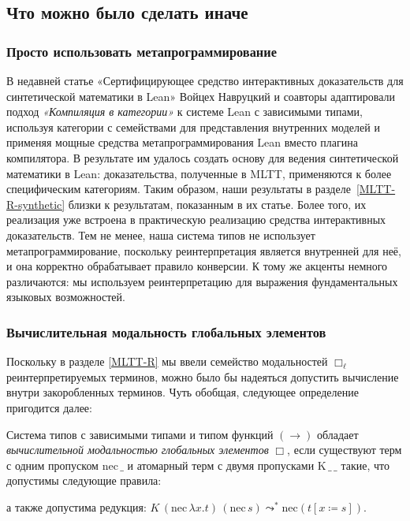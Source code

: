 \subsection{Что можно было сделать иначе}

\subsubsection
{Просто использовать метапрограммирование}

В недавней статье «Сертифицирующее средство
интерактивных доказательств для синтетической
математики в Lean» Войцех Навруцкий и соавторы
\cite{Nawrocki:Lean2026} адаптировали подход
\emph{«Компиляция в категории»}
\cite{Elliott:Compcat2017} к системе Lean с зависимыми
типами, используя категории с семействами для
представления внутренних моделей и применяя мощные
средства метапрограммирования Lean вместо плагина
компилятора. В результате им удалось создать основу
для ведения синтетической математики в Lean:
доказательства, полученные в MLTT, применяются к более
специфическим категориям. Таким образом, наши
результаты в разделе~\ref{MLTT-R-synthetic} близки к
результатам, показанным в их статье. Более того, их
реализация уже встроена в практическую реализацию
средства интерактивных доказательств. Тем не менее,
наша система типов не использует метапрограммирование,
поскольку реинтерпретация является внутренней для неё,
и она корректно обрабатывает правило конверсии. К тому
же акценты немного различаются: мы используем
реинтерпретацию для выражения фундаментальных языковых
возможностей.

\subsubsection{
    Вычислительная модальность глобальных элементов}
\label{global-elements}

Поскольку в разделе \ref{MLTT-R} мы ввели семейство
модальностей $\Box_\ell$ реинтерпретируемых терминов,
можно было бы надеяться допустить вычисление внутри
закоробленных терминов. Чуть обобщая, следующее
определение пригодится далее:

\begin{definition}
    Система типов с зависимыми типами и типом функций
    $(\to)$ обладает \textit{вычислительной
    модальностью глобальных элементов} $\Box$, если
    существуют терм с одним пропуском
    $\mathrm{nec}\,\_$ и атомарный терм с двумя
    пропусками $\mathrm{K}\,\_\,\_$ такие, что
    допустимы следующие правила:
    а также допустима редукция:
    $K\,(\mathrm{nec}\,\lambda x.t)\,
    (\mathrm{nec}\,s)\leadsto^*
    \mathrm{nec}(t[x\coloneqq s])$.
\end{definition}

